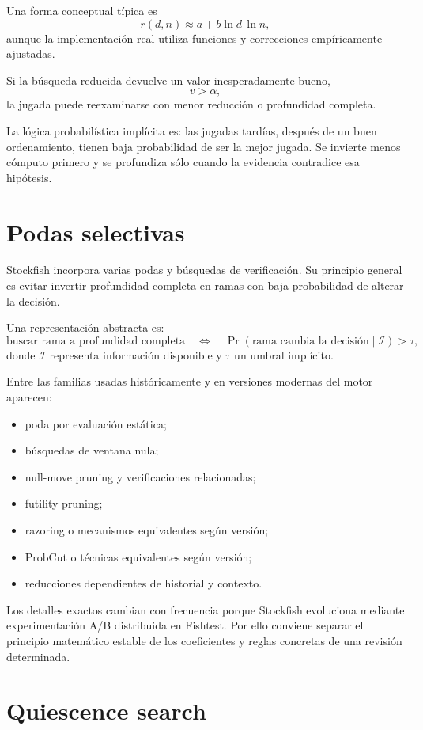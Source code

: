 \documentclass[11pt,a4paper]{article}
\begin{document}
Una forma conceptual típica es
\[
    r(d,n) \approx a+b\ln d\,\ln n,
\]
aunque la implementación real utiliza funciones y correcciones empíricamente ajustadas.

Si la búsqueda reducida devuelve un valor inesperadamente bueno,
\[
    v > \alpha,
\]
la jugada puede reexaminarse con menor reducción o profundidad completa.

La lógica probabilística implícita es: las jugadas tardías, después de un buen ordenamiento, tienen baja probabilidad de ser la mejor jugada. Se invierte menos cómputo primero y se profundiza sólo cuando la evidencia contradice esa hipótesis.

\section{Podas selectivas}

Stockfish incorpora varias podas y búsquedas de verificación. Su principio general es evitar invertir profundidad completa en ramas con baja probabilidad de alterar la decisión.

Una representación abstracta es:
\[
\text{buscar rama a profundidad completa}
\quad\Longleftrightarrow\quad
\Pr(\text{rama cambia la decisión}\mid\mathcal I) > \tau,
\]
donde $\mathcal I$ representa información disponible y $\tau$ un umbral implícito.

Entre las familias usadas históricamente y en versiones modernas del motor aparecen:
\begin{itemize}
    \item poda por evaluación estática;
    \item búsquedas de ventana nula;
    \item null-move pruning y verificaciones relacionadas;
    \item futility pruning;
    \item razoring o mecanismos equivalentes según versión;
    \item ProbCut o técnicas equivalentes según versión;
    \item reducciones dependientes de historial y contexto.
\end{itemize}

Los detalles exactos cambian con frecuencia porque Stockfish evoluciona mediante experimentación A/B distribuida en Fishtest. Por ello conviene separar el principio matemático estable de los coeficientes y reglas concretas de una revisión determinada.

\section{Quiescence search}
\end{document}
